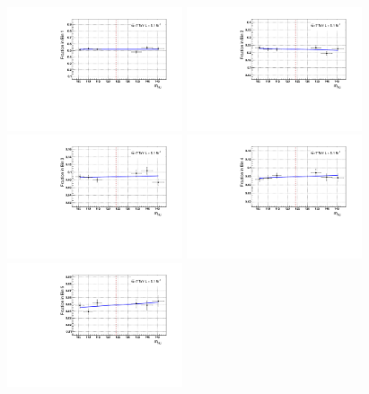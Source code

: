 \begin{figure}
 \begin{center}
  \includegraphics[width=0.46\textwidth]{hgg7TeV/sidebandMvaPlots/fits/m124_bg_bdt_bin_1}
  \includegraphics[width=0.46\textwidth]{hgg7TeV/sidebandMvaPlots/fits/m124_bg_bdt_bin_2}\\
  \includegraphics[width=0.46\textwidth]{hgg7TeV/sidebandMvaPlots/fits/m124_bg_bdt_bin_3}
  \includegraphics[width=0.46\textwidth]{hgg7TeV/sidebandMvaPlots/fits/m124_bg_bdt_bin_4}\\
  \includegraphics[width=0.46\textwidth]{hgg7TeV/sidebandMvaPlots/fits/m124_bg_bdt_bin_5}

\end{center}
\end{figure}
